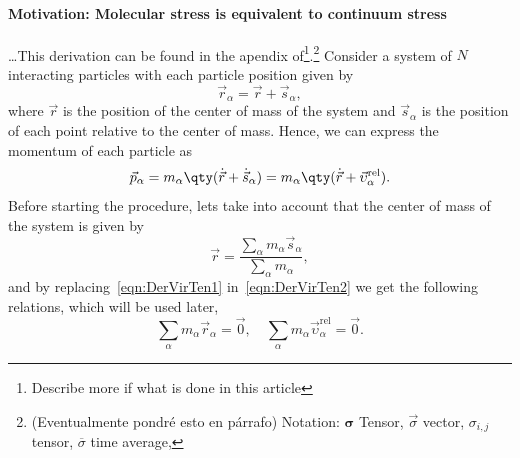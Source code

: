 \paragraph{Motivation: Molecular stress is equivalent to continuum stress} \dots This derivation can be found in the apendix of\citep{admalUnifiedInterpretationStress2010}\footnote{Describe more if what is done in this article}.\footnote{(Eventualmente pondré esto en párrafo) Notation:
    $\bm{\sigma}$ Tensor, $\vec{\sigma}$ vector, $\sigma_{i,j}$ tensor, $\overline{\sigma}$ time average, 
}
Consider a system of $N$ interacting particles with each particle position given by
\begin{equation}
    \vec{r}_{\alpha} = \vec{r} + \vec{s}_{\alpha}\label{eqn:DerVirTen1},
\end{equation}
where $\vec{r}$ is the position of the center of mass of the system and $\vec{s}_\alpha$ is the position of each point relative to the center of mass.
Hence, we can express the momentum of each particle as
\begin{equation}
    \vec{p}_\alpha = m_\alpha\qty(\dot{\vec{r}}+\dot{\vec{s}}_\alpha) = m_\alpha\qty(\dot{\vec{r}}+\vec{\upsilon}_\alpha^{\mathrm{rel}}).\label{eqn:DerVirTen2}
\end{equation}
Before starting the procedure, lets take into account that the center of mass of the system is given by
\begin{equation}
    \vec{r} = \frac{\sum_{\alpha}m_\alpha\vec{s}_\alpha}{\sum_{\alpha}m_\alpha}\label{eqn:DerVirTen3},
\end{equation}
and by replacing~\eqref{eqn:DerVirTen1} in~\eqref{eqn:DerVirTen2} we get the following relations, which will be used later,
\begin{equation}
    \sum_\alpha m_\alpha\vec{r}_\alpha = \vec{0},\quad
    \sum_\alpha m_\alpha\vec{\upsilon}_\alpha^{\mathrm{rel}} = \vec{0}.\label{eqn:DerVirTen4}
\end{equation}

